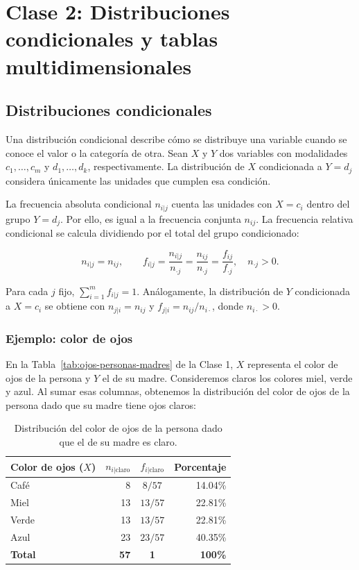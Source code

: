 \chapter{Clase 2: Distribuciones condicionales y tablas multidimensionales}

\section{Distribuciones condicionales}

Una distribución condicional describe cómo se distribuye una variable cuando se conoce el valor o la categoría de otra. Sean $X$ y $Y$ dos variables con modalidades $c_1,\ldots,c_m$ y $d_1,\ldots,d_k$, respectivamente. La distribución de $X$ condicionada a $Y=d_j$ considera únicamente las unidades que cumplen esa condición.

La frecuencia absoluta condicional $n_{i|j}$ cuenta las unidades con $X=c_i$ dentro del grupo $Y=d_j$. Por ello, es igual a la frecuencia conjunta $n_{ij}$. La frecuencia relativa condicional se calcula dividiendo por el total del grupo condicionado:

\begin{equation*}
n_{i|j}=n_{ij},\qquad
f_{i|j}=\frac{n_{i|j}}{n_{\cdot j}}=\frac{n_{ij}}{n_{\cdot j}}=\frac{f_{ij}}{f_{\cdot j}},\quad n_{\cdot j}>0.
\end{equation*}

Para cada $j$ fijo, $\sum_{i=1}^{m}f_{i|j}=1$. Análogamente, la distribución de $Y$ condicionada a $X=c_i$ se obtiene con $n_{j|i}=n_{ij}$ y $f_{j|i}=n_{ij}/n_{i\cdot}$, donde $n_{i\cdot}>0$.

\subsection{Ejemplo: color de ojos}

En la Tabla~\ref{tab:ojos-personas-madres} de la Clase 1, $X$ representa el color de ojos de la persona y $Y$ el de su madre. Consideremos claros los colores miel, verde y azul. Al sumar esas columnas, obtenemos la distribución del color de ojos de la persona dado que su madre tiene ojos claros:

\begin{table}[H]
\centering
\small
\renewcommand{\arraystretch}{1.15}
\begin{tabular}{|l|r|c|r|}
\hline
\textbf{Color de ojos ($X$)} & \textbf{$n_{i|\text{claro}}$} & \textbf{$f_{i|\text{claro}}$} & \textbf{Porcentaje} \\ \hline
Café  & 8  & $8/57$  & 14.04\% \\ \hline
Miel  & 13 & $13/57$ & 22.81\% \\ \hline
Verde & 13 & $13/57$ & 22.81\% \\ \hline
Azul  & 23 & $23/57$ & 40.35\% \\ \hline
\textbf{Total} & \textbf{57} & \textbf{1} & \textbf{100\%} \\ \hline
\end{tabular}
\caption{Distribución del color de ojos de la persona dado que el de su madre es claro.}
\label{tab:ojos-condicional}
\end{table}

